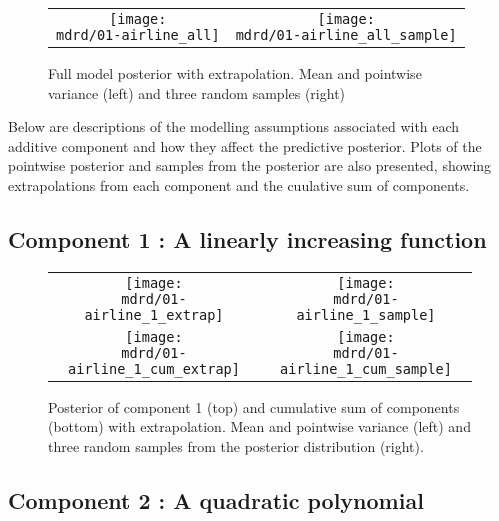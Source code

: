 \documentclass{article} %
\begin{document}
\begin{figure}[H]
\newcommand{\wmgd}{0.5\columnwidth}
\newcommand{\hmgd}{3.0cm}
\newcommand{\mdrd}{01-airline}
\newcommand{\mbm}{\hspace{-0.3cm}}
\begin{tabular}{cc}
\mbm \texttt{[image: \\mdrd/01-airline\_all]} & \texttt{[image: \\mdrd/01-airline\_all\_sample]}
\end{tabular}
\caption{Full model posterior with extrapolation. Mean and pointwise variance (left) and three random samples (right)}
\label{fig:extrap}
\end{figure}

Below are descriptions of the modelling assumptions associated with each additive component and how they affect the predictive posterior.
Plots of the pointwise posterior and samples from the posterior are also presented, showing extrapolations from each component and the cuulative sum of components.

\subsection{Component 1 : A linearly increasing function}



\begin{figure}[H]
\newcommand{\wmgd}{0.5\columnwidth}
\newcommand{\hmgd}{3.0cm}
\newcommand{\mdrd}{01-airline}
\newcommand{\mbm}{\hspace{-0.3cm}}
\begin{tabular}{cc}
\mbm \texttt{[image: \\mdrd/01-airline\_1\_extrap]} & \texttt{[image: \\mdrd/01-airline\_1\_sample]} \\
\mbm \texttt{[image: \\mdrd/01-airline\_1\_cum\_extrap]} & \texttt{[image: \\mdrd/01-airline\_1\_cum\_sample]}
\end{tabular}
\caption{Posterior of component 1 (top) and cumulative sum of components (bottom) with extrapolation. Mean and pointwise variance (left) and three random samples from the posterior distribution (right).}
\label{fig:extrap1}
\end{figure}

\subsection{Component 2 : A quadratic polynomial}
\end{document}
